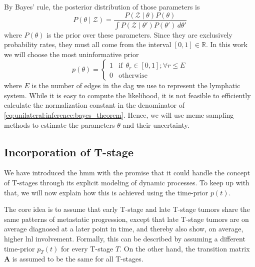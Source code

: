\documentclass[\relativeRoot/main.tex]{subfiles}
\begin{document}
By Bayes' rule, the posterior distribution of those parameters is 
%
\begin{equation} \label{eq:unilateral:inference:bayes_theorem}
    P \left( \theta \mid \boldsymbol{\mathcal{Z}} \right) = \frac{P \left( \boldsymbol{\mathcal{Z}} \mid \theta \right) P\left( \theta \right)}{\int{P \left( \boldsymbol{\mathcal{Z}} \mid \theta' \right) P \left( \theta' \right) \,d\theta'}}
\end{equation}
%
where $P(\theta)$ is the prior over these parameters. Since they are exclusively probability rates, they must all come from the interval $[0,1] \in \mathbb{R}$. In this work we will choose the most uninformative prior
%
\begin{equation}
    p(\theta) = 
    \begin{cases}
        1 & \text{if} \ \ \theta_r \in \left[ 0,1 \right]; \forall r \leq E \\
        0 & \text{otherwise}
    \end{cases}
\end{equation}
%
where $E$ is the number of edges in the \gls{dag} we use to represent the lymphatic system. While it is easy to compute the likelihood, it is not feasible to efficiently calculate the normalization constant in the denominator of \cref{eq:unilateral:inference:bayes_theorem}. Hence, we will use \gls{mcmc} sampling methods to estimate the parameters $\theta$ and their uncertainty.

\subsection{Incorporation of T-stage}
\label{subsec:unilateral:formalism:tstage}

We have introduced the \gls{hmm} with the promise that it could handle the concept of T-stages through its explicit modeling of dynamic processes. To keep up with that, we will now explain how this is achieved using the time-prior $p(t)$.

The core idea is to assume that early T-stage and late T-stage tumors share the same patterns of metastatic progression, except that late T-stage tumors are on average diagnosed at a later point in time, and thereby also show, on average, higher \gls{lnl} involvement. Formally, this can be described by assuming a different time-prior $p_T (t)$ for every T-stage $T$.  On the other hand, the transition matrix $\mathbf{A}$ is assumed to be the same for all T-stages.
\end{document}

